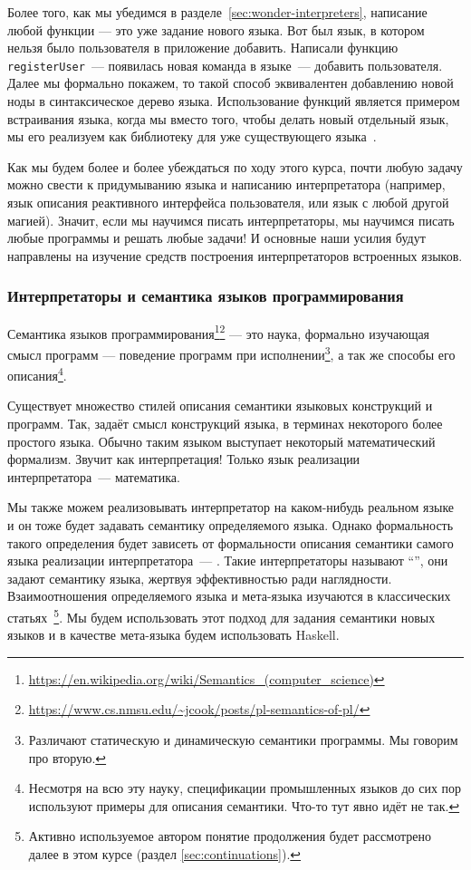 Более того, как мы убедимся в разделе~\ref{sec:wonder-interpreters}, написание любой функции --- это уже задание нового языка.
Вот был язык, в котором нельзя было пользователя в приложение добавить.
Написали функцию \texttt{registerUser}~--- появилась новая команда в языке~--- добавить пользователя.
Далее мы формально покажем, то такой способ эквивалентен добавлению новой ноды в синтаксическое дерево языка.
Использование функций является примером встраивания языка, когда мы вместо того, чтобы делать новый отдельный язык, мы его реализуем как библиотеку для уже существующего языка~\cite{gibbons2013functional}.

Как мы будем более и более убеждаться по ходу этого курса, почти любую задачу можно свести к придумыванию языка и написанию интерпретатора (например, язык описания реактивного интерфейса пользователя, или язык с любой другой магией).
Значит, если мы научимся писать интерпретаторы, мы научимся писать любые программы и решать любые задачи!
И основные наши усилия будут направлены на изучение средств построения интерпретаторов встроенных языков.

\subsubsection{Интерпретаторы и семантика языков программирования} \label{subsubsec:semantics}


Семантика языков программирования\footnote{\url{https://en.wikipedia.org/wiki/Semantics_(computer_science)}\label{note:sema-wiki}}\footnote{\url{https://www.cs.nmsu.edu/~jcook/posts/pl-semantics-of-pl/}\label{note:sema-cook}} --- это наука, формально изучающая смысл программ --- поведение программ при исполнении\footnote{Различают статическую и динамическую семантики программы. Мы говорим про вторую.}, а так же способы его описания\footnote{Несмотря на всю эту науку, спецификации промышленных языков до сих пор используют примеры для описания семантики. Что-то тут явно идёт не так.}.

Существует множество стилей описания семантики языковых конструкций и программ.
Так,  задаёт смысл конструкций языка, в терминах некоторого более простого языка.
Обычно таким языком выступает некоторый математический формализм.
Звучит как интерпретация!
Только язык реализации интерпретатора~--- математика.

Мы также можем реализовывать интерпретатор на каком-нибудь реальном языке и он тоже будет задавать семантику определяемого языка.
Однако формальность такого определения будет зависеть от формальности описания семантики самого языка реализации интерпретатора~--- .
Такие интерпретаторы называют ``'', они задают семантику языка, жертвуя эффективностью ради наглядности.
Взаимоотношения определяемого языка и мета-языка изучаются в классических статьях~\cite{reynolds1972definitional,reynolds1998definitional}\footnote{Активно используемое автором понятие продолжения будет рассмотрено далее в этом курсе (раздел \ref{sec:continuations}).}.
Мы будем использовать этот подход для задания семантики новых языков и в качестве мета-языка будем использовать Haskell.

